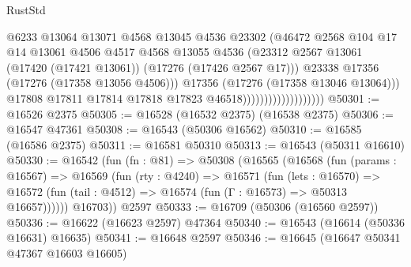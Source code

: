 \begin{lexlean}{RustStd}
\begin{coremodule}
                                            @6233
                                            @13064
                                            @13071
                                            @4568
                                            @13045
                                            @4536
                                            @23302
                                            (@46472
                                              @2568
                                              @104
                                              @17
                                              @14
                                              @13061
                                              @4506
                                              @4517
                                              @4568
                                              @13055
                                              @4536
                                              (@23312
                                                @2567
                                                @13061
                                                (@17420 (@17421 @13061))
                                                (@17276 (@17426 @2567 @17)))
                                              @23338
                                              @17356
                                              (@17276 (@17358 @13056 @4506)))
                                            @17356
                                            (@17276 (@17358 @13046 @13064)))
                                          @17808
                                          @17811
                                          @17814
                                          @17818
                                          @17823
                                          @46518)))))))))))))))))))
@50301 := @16526 @2375
@50305 := @16528 (@16532 @2375) (@16538 @2375)
@50306 := @16547 @47361
@50308 := @16543 (@50306 @16562)
@50310 := @16585 (@16586 @2375)
@50311 := @16581 @50310
@50313 := @16543 (@50311 @16610)
@50330 := @16542
    (fun (fn : @81) =>
    @50308
      (@16565
        (@16568
          (fun (params : @16567) =>
          @16569
            (fun (rty : @4240) =>
            @16571
              (fun (lets : @16570) =>
              @16572 (fun (tail : @4512) => @16574 (fun (Γ : @16573) => @50313 @16657))))))
        @16703))
    @2597
@50333 := @16709 (@50306 (@16560 @2597))
@50336 := @16622 (@16623 @2597) @47364
@50340 := @16543 (@16614 (@50336 @16631) @16635)
@50341 := @16648 @2597
@50346 := @16645 (@16647 @50341 @47367 @16603 @16605)

\end{coremodule}
\end{lexlean}
